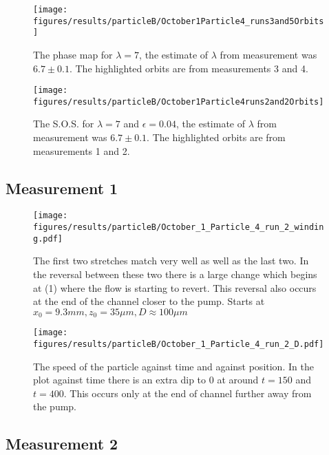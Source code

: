 


\begin{figure}[H]
\centering
\texttt{[image: figures/results/particleB/October1Particle4\_runs3and5Orbits]}
\caption{The phase map for $\lambda = 7$, the estimate of $\lambda$ from measurement was $6.7 \pm 0.1$. The highlighted orbits are from measurements 3 and 4.}
\label{fig:October1Particle4_runs3and5Orbits}
\end{figure}


\begin{figure}[H]
\centering
\texttt{[image: figures/results/particleB/October1Particle4runs2and2Orbits]}
\caption{The S.O.S. for $\lambda = 7$ and $\epsilon=0.04$, the estimate of $\lambda$ from measurement was $6.7 \pm 0.1$. The highlighted orbits are from measurements 1 and 2.}
\label{fig:October1Particle4runs2and2Orbits}
\end{figure}


\subsection{Measurement 1}
\begin{figure}[H]
\begin{center}
\texttt{[image: figures/results/particleB/October\_1\_Particle\_4\_run\_2\_winding.pdf]}
\end{center}
\caption{The first two stretches match very well as well as the last two. In the reversal between these two there is a large change which begins at (1) where the flow is starting to revert. This reversal also occurs at the end of the channel closer to the pump. Starts at $ x_0 = 9.3 mm, z_0 = 35\mu m, D \approx 100\mu m$}
\label{fig:particleB1}
\end{figure}
	
\begin{figure}[H]
\begin{center}
\texttt{[image: figures/results/particleB/October\_1\_Particle\_4\_run\_2\_D.pdf]}
\end{center}
\caption{The speed of the particle against time and against position. In the plot against time there is an extra dip to 0 at around $t=150$ and $t=400$. This occurs only at the end of channel further away from the pump.}
\label{fig:particleB1speed}
\end{figure}

\subsection{Measurement 2}

